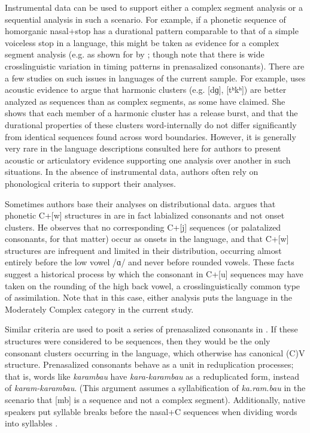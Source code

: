   Instrumental data can be used to support either a complex segment analysis or a sequential analysis in such a scenario. For example, if a phonetic sequence of homorganic nasal+stop has a durational pattern comparable to that of a simple voiceless stop in a language, this might be taken as evidence for a complex segment analysis (e.g. as shown for  by \citealt{Maddieson1989a}; though \citealt{LadefogedMaddieson1996} note that there is wide crosslinguistic variation in timing patterns in prenasalized consonants). There are a few studies on such issues in languages of the current sample. For example, \citet{Chitoran1998} uses acoustic evidence to argue that  harmonic clusters (e.g. [dɡ], [tʰkʰ]) are better analyzed as sequences than as complex segments, as some have claimed. She shows that each member of a harmonic cluster has a release burst, and that the durational properties of these clusters word-internally do not differ significantly from identical sequences found across word boundaries. However, it is generally very rare in the language descriptions consulted here for authors to present acoustic or articulatory evidence supporting one analysis over another in such situations. In the absence of instrumental data, authors often rely on phonological criteria to support their analyses.

  Sometimes authors base their analyses on distributional data. \citet[135--138]{Erickson2001} argues that phonetic C+[w] structures in  are in fact labialized consonants and not onset clusters. He observes that no corresponding C+[j] sequences (or palatalized consonants, for that matter) occur as onsets in the language, and that C+[w] structures are infrequent and limited in their distribution, occurring almost entirely before the low vowel /ɑ/ and never before rounded vowels. These facts suggest a historical process by which the consonant in C+[u] sequences may have taken on the rounding of the high back vowel, a crosslinguistically common type of assimilation. Note that in this case, either analysis puts the language in the Moderately Complex category in the current study.

  Similar criteria are used to posit a series of prenasalized consonants in . If these structures were considered to be sequences, then they would be the only consonant clusters occurring in the language, which otherwise has canonical (C)V structure. Prenasalized consonants behave as a unit in reduplication processes; that is, words like \textit{karambau} have \textit{kara-karambau} as a reduplicated form, instead of \textit{karam-karambau}. (This argument assumes a syllabification of \textit{ka.ram.bau} in the scenario that [mb] is a sequence and not a complex segment). Additionally, native speakers put syllable breaks before the nasal+C sequences when dividing words into syllables \citep[30--31]{Donohue1999}. 

